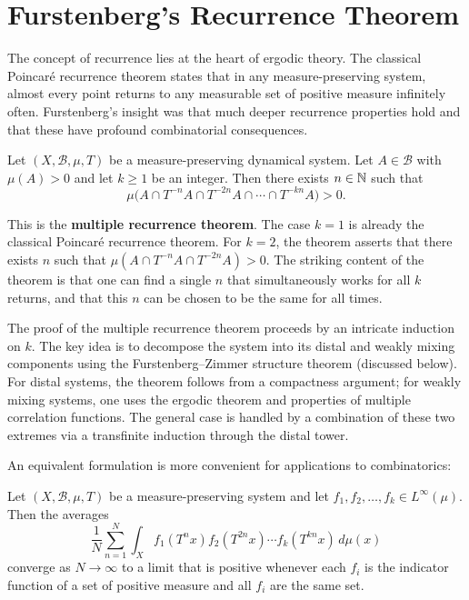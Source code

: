 \section{Furstenberg's Recurrence Theorem}

The concept of recurrence lies at the heart of ergodic theory. The classical Poincar\'e recurrence theorem states that in any measure-preserving system, almost every point returns to any measurable set of positive measure infinitely often. Furstenberg's insight was that much deeper recurrence properties hold and that these have profound combinatorial consequences.

\begin{theorem}
Let \((X,\mathscr{B},\mu,T)\) be a measure-preserving dynamical system. Let \(A \in \mathscr{B}\) with \(\mu(A) > 0\) and let \(k \geq 1\) be an integer. Then there exists \(n \in \mathbb{N}\) such that
\[
\mu\bigl(A \cap T^{-n}A \cap T^{-2n}A \cap \cdots \cap T^{-kn}A\bigr) > 0.
\]
\end{theorem}

This is the \textbf{multiple recurrence theorem}. The case \(k = 1\) is already the classical Poincar\'e recurrence theorem. For \(k = 2\), the theorem asserts that there exists \(n\) such that \(\mu(A \cap T^{-n}A \cap T^{-2n}A) > 0\). The striking content of the theorem is that one can find a single \(n\) that simultaneously works for all \(k\) returns, and that this \(n\) can be chosen to be the same for all times.

The proof of the multiple recurrence theorem proceeds by an intricate induction on \(k\). The key idea is to decompose the system into its distal and weakly mixing components using the Furstenberg--Zimmer structure theorem (discussed below). For distal systems, the theorem follows from a compactness argument; for weakly mixing systems, one uses the ergodic theorem and properties of multiple correlation functions. The general case is handled by a combination of these two extremes via a transfinite induction through the distal tower.

An equivalent formulation is more convenient for applications to combinatorics:

\begin{theorem}
Let \((X,\mathscr{B},\mu,T)\) be a measure-preserving system and let \(f_1, f_2, \dots, f_k \in L^\infty(\mu)\). Then the averages
\[
\frac{1}{N} \sum_{n=1}^{N} \int_X f_1(T^n x) f_2(T^{2n}x) \cdots f_k(T^{kn}x) \, d\mu(x)
\]
converge as \(N \to \infty\) to a limit that is positive whenever each \(f_i\) is the indicator function of a set of positive measure and all \(f_i\) are the same set.
\end{theorem}


